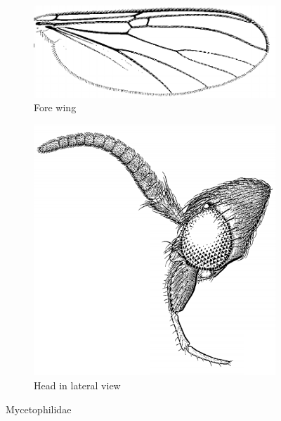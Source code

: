 \documentclass[letterpaper, 11pt]{article}
\begin{document}
\begin{figure}[ht!]
    \centering
    \begin{subfigure}[ht!]{0.45\textwidth}
        \includegraphics[width=\textwidth]{MycetophilidWing}
        \caption{Fore wing \citep[][Fig. 14.24]{mcalpine1981manual}}
        \label{fig:mycetophilid1}
    \end{subfigure}
    \qquad
    \begin{subfigure}[ht!]{0.27\textwidth}
        \includegraphics[width=\textwidth]{MycetophilidHead}
        \caption{Head in lateral view \citep[][Fig. 13.1]{mcalpine1981manual}}
        \label{fig:mycetophilid2}
    \end{subfigure}
    \caption{Mycetophilidae}\label{fig:mycetophilids}
\end{figure}
\end{document}
